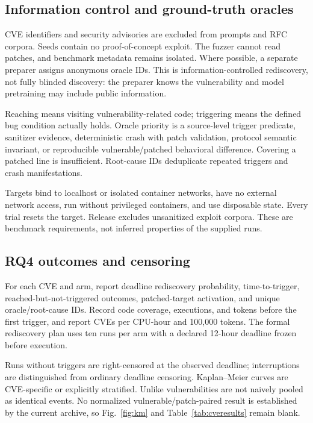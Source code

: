 \documentclass[final,5p,times,number]{elsarticle}
\newcommand{\figref}[1]{Fig.~\ref{#1}}
\begin{document}
\subsection{Information control and ground-truth oracles}
CVE identifiers and security advisories are excluded from prompts and RFC corpora. Seeds contain no proof-of-concept exploit. The fuzzer cannot read patches, and benchmark metadata remains isolated. Where possible, a separate preparer assigns anonymous oracle IDs. This is information-controlled rediscovery, not fully blinded discovery: the preparer knows the vulnerability and model pretraining may include public information.

Reaching means visiting vulnerability-related code; triggering means the defined bug condition actually holds. Oracle priority is a source-level trigger predicate, sanitizer evidence, deterministic crash with patch validation, protocol semantic invariant, or reproducible vulnerable/patched behavioral difference. Covering a patched line is insufficient. Root-cause IDs deduplicate repeated triggers and crash manifestations.

Targets bind to localhost or isolated container networks, have no external network access, run without privileged containers, and use disposable state. Every trial resets the target. Release excludes unsanitized exploit corpora. These are benchmark requirements, not inferred properties of the supplied runs.

\subsection{RQ4 outcomes and censoring}
For each CVE and arm, report deadline rediscovery probability, time-to-trigger, reached-but-not-triggered outcomes, patched-target activation, and unique oracle/root-cause IDs. Record code coverage, executions, and tokens before the first trigger, and report CVEs per CPU-hour and 100,000 tokens. The formal rediscovery plan uses ten runs per arm with a declared 12-hour deadline frozen before execution.

Runs without triggers are right-censored at the observed deadline; interruptions are distinguished from ordinary deadline censoring. Kaplan--Meier curves are CVE-specific or explicitly stratified. Unlike vulnerabilities are not naively pooled as identical events. No normalized vulnerable/patch-paired result is established by the current archive, so \figref{fig:km} and Table~\ref{tab:cveresults} remain blank.
\end{document}
